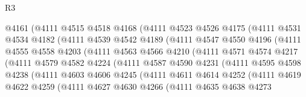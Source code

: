 \begin{lexlean}{R3}
\begin{coremodule}
                  @4161
                  (@4111
                    @4515
                    @4518
                    @4168
                    (@4111
                      @4523
                      @4526
                      @4175
                      (@4111
                        @4531
                        @4534
                        @4182
                        (@4111
                          @4539
                          @4542
                          @4189
                          (@4111
                            @4547
                            @4550
                            @4196
                            (@4111
                              @4555
                              @4558
                              @4203
                              (@4111
                                @4563
                                @4566
                                @4210
                                (@4111
                                  @4571
                                  @4574
                                  @4217
                                  (@4111
                                    @4579
                                    @4582
                                    @4224
                                    (@4111
                                      @4587
                                      @4590
                                      @4231
                                      (@4111
                                        @4595
                                        @4598
                                        @4238
                                        (@4111
                                          @4603
                                          @4606
                                          @4245
                                          (@4111
                                            @4611
                                            @4614
                                            @4252
                                            (@4111
                                              @4619
                                              @4622
                                              @4259
                                              (@4111
                                                @4627
                                                @4630
                                                @4266
                                                (@4111
                                                  @4635
                                                  @4638
                                                  @4273

\end{coremodule}
\end{lexlean}
